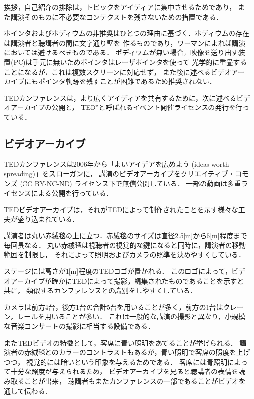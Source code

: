 \documentclass[submit,techreq,jkeyword,noauthor]{ipsj}
\newcommand{\TED}{\textrm{TED}}
\newcommand{\TEDx}{\TED${}^{\textrm{x}}$}
\begin{document}
挨拶，自己紹介の排除は，トピックをアイディアに集中させるためであり，
また講演そのものに不必要なコンテクストを残さないための措置である．

ポインタおよびポディウムの非推奨はひとつの理由に基づく．ポディウムの存在は講演者と聴講者の間に文字通り壁を
作るものであり，ワーマンによれば講演においては避けるべきものである．
ポディウムが無い場合，映像を送り出す装置(PC)は手元に無いためポインタはレーザポインタを使って
光学的に重畳することになるが，これは複数スクリーンに対応せず，
また後に述べるビデオアーカイブにもポインタ軌跡を残すことが困難であるため推奨されない．


\TED カンファレンスは，より広くアイディアを共有するために，次に述べるビデオアーカイブの公開と，
\TEDx と呼ばれるイベント開催ライセンスの発行を行っている．

\subsection{ビデオアーカイブ}

\TED カンファレンスは2006年から「よいアイデアを広めよう (ideas worth spreading)」をスローガンに，
講演のビデオアーカイブをクリエイティブ・コモンズ (CC BY-NC-ND) ライセンス下で無償公開している．
一部の動画は多重ライセンスによる公開を行っている．

\TED ビデオアーカイブは，それが\TED によって制作されたことを示す様々な工夫が盛り込まれている．

講演者は丸い赤絨毯の上に立つ．赤絨毯のサイズは直径2.5[m]から5[m]程度まで毎回異なる．
丸い赤絨毯は視聴者の視覚的な鍵になると同時に，講演者の移動範囲を制限し，
それによって照明およびカメラの照準を決めやすくしている．

ステージには高さが1[m]程度の\TED ロゴが置かれる．
このロゴによって，ビデオアーカイブが確かに\TED によって撮影，編集されたものであることを示すと共に，
類似するカンファレンスとの識別をしやすくしている．

カメラは前方4台，後方1台の合計5台を用いることが多く，前方の1台はクレーン，レールを用いることが多い．
これは一般的な講演の撮影と異なり，小規模な音楽コンサートの撮影に相当する設備である．

また\TED ビデオの特徴として，客席に青い照明をあてることが挙げられる．
講演者の赤絨毯とのカラーのコントラストもあるが，青い照明で客席の照度を上げつつ，
視覚的には暗いという印象を与えるためである．
客席には青照明によって十分な照度が与えられるため，
ビデオアーカイブを見ると聴講者の表情を読み取ることが出来，
聴講者もまたカンファレンスの一部であることがビデオを通して伝わる．
\end{document}
